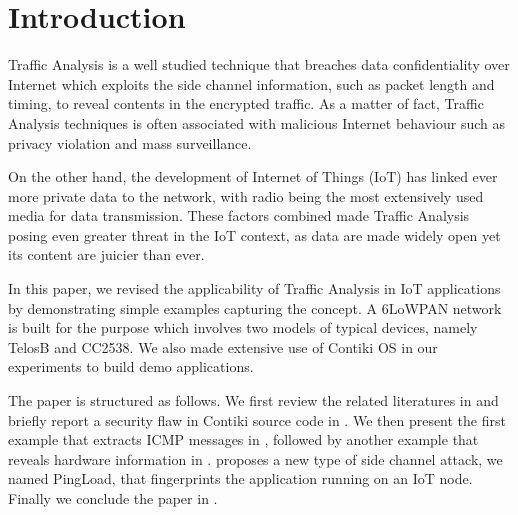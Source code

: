 \section{Introduction}
Traffic Analysis is a well studied technique that breaches data confidentiality over Internet which exploits the side channel information, such as packet length and timing, to reveal contents in the encrypted traffic. As a matter of fact, Traffic Analysis techniques is often associated with malicious Internet behaviour such as privacy violation and mass surveillance. 


On the other hand, the development of Internet of Things (IoT) has linked ever more private data to the network, with radio being the most extensively used media for data transmission. These factors combined made Traffic Analysis posing even greater threat in the IoT context, as data are made widely open yet its content are juicier than ever.


In this paper, we revised the applicability of Traffic Analysis in IoT applications by demonstrating simple examples capturing the concept. A 6LoWPAN\cite{rfc4944} network is built for the purpose which involves two models of typical devices, namely TelosB\cite{TelosB} and CC2538\cite{CC2538}. We also made extensive use of Contiki OS\cite{Contiki} in our experiments to build demo applications.

The paper is structured as follows. We first review the related literatures in  and briefly report a security flaw in Contiki source code in . We then present the first example that extracts ICMP messages in , followed by another example that reveals hardware information in .  proposes a new type of side channel attack, we named PingLoad, that fingerprints the application running on an IoT node. Finally we conclude the paper in .

